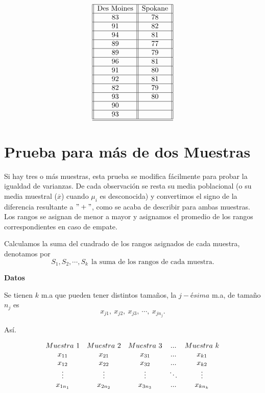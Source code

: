 \documentclass[
  a4paper,
  oneside,
  openany]{book}
\begin{document}
\[
\begin{array}{||c| |c||} 
\hline 
\mbox{Des Moines}& \mbox{Spokane} \\ 
 \hline
83&78\\
 \hline
91&82\\
 \hline
94&81\\
 \hline
89&77\\
 \hline
89&79\\
 \hline
96&81\\
 \hline
91&80\\
 \hline
92&81\\
 \hline
82&79\\
 \hline
93&80\\
 \hline
90&\\
 \hline
93&\\
 \hline
\hline
\end{array}
\]

\hypertarget{prueba-para-muxe1s-de-dos-muestras}{%
\chapter{Prueba para más de dos Muestras}\label{prueba-para-muxe1s-de-dos-muestras}}

Si hay tres o más muestras, esta prueba se modifica fácilmente para probar la igualdad de varianzas. De cada observación se resta su media poblacional (o su media muestral (\(\overline{x}\)) cuando \(\mu_{i}\) es desconocida) y convertimos el signo de la diferencia resultante a \("+"\), como se acaba de describir para ambas muestras.
Los rangos se asignan de menor a mayor y asignamos el promedio de los rangos correspondientes en caso de empate.

Calculamos la suma del cuadrado de los rangos asignados de cada muestra, denotamos por \[S_{1},S_{2},\cdots,S_{k} \  \ \mbox{la suma de los rangos de cada muestra.}\]

\textbf{Datos}

Se tienen \(k\) m.a que pueden tener distintos tamaños, la \(j-ésima\) m.a, de tamaño \(n_j\) es \[x_{j1},\ x_{j2},\ x_{j3},\ \cdots, \ x_{jn_j}.\]

Así.

\[
\begin{array}{c c c c c} 
Muestra \ 1&Muestra\ 2&Muestra\ 3&...& Muestra\ k \\
x_{11}&x_{21}&x_{31}&...&x_{k1}\\
x_{12}&x_{22}&x_{32}&...&x_{k2}\\
\vdots&\vdots&\vdots&\ddots&\vdots\\
x_{1n_1}&x_{2n_2}&x_{3n_3}&...&x_{kn_k}\\
\end{array}
\]
\end{document}
